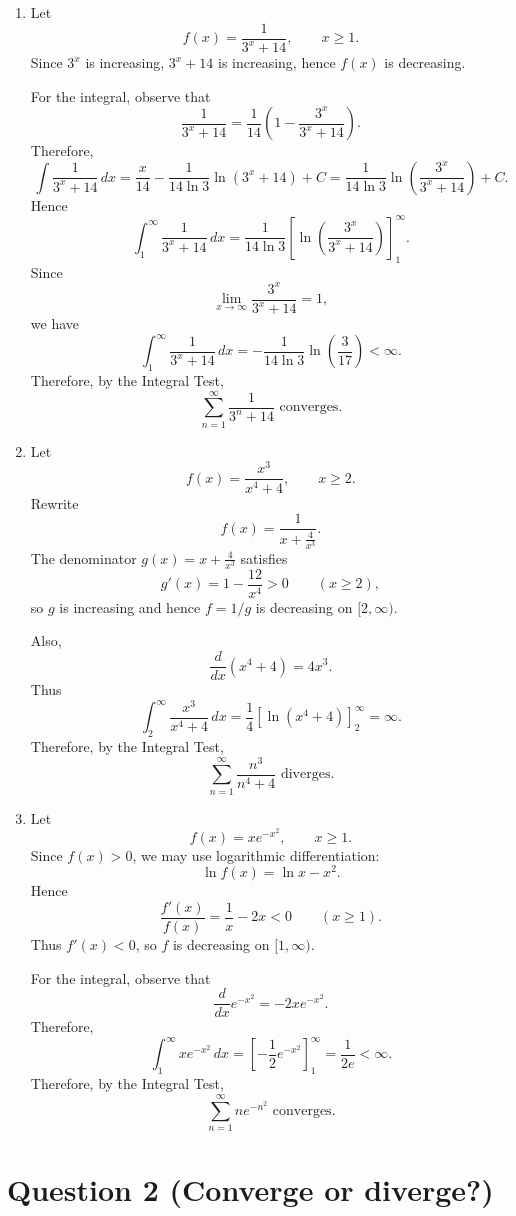 \documentclass[12pt]{article}
\begin{document}
\begin{enumerate}[label=(\alph*)]
\item Let
\[
f(x)=\frac{1}{3^x+14}, \qquad x\ge 1.
\]
Since \(3^x\) is increasing, \(3^x+14\) is increasing, hence \(f(x)\) is decreasing.

For the integral, observe that
\[
\frac{1}{3^x+14}
=
\frac{1}{14}
\left(1-\frac{3^x}{3^x+14}\right).
\]
Therefore,
\[
\int \frac{1}{3^x+14}\,dx
=
\frac{x}{14}
-
\frac{1}{14\ln 3}\ln(3^x+14)+C
=
\frac{1}{14\ln 3}
\ln\left(\frac{3^x}{3^x+14}\right)+C.
\]
Hence
\[
\int_1^\infty \frac{1}{3^x+14}\,dx
=
\frac{1}{14\ln 3}
\left[
\ln\left(\frac{3^x}{3^x+14}\right)
\right]_1^\infty.
\]
Since
\[
\lim_{x\to\infty}\frac{3^x}{3^x+14}=1,
\]
we have
\[
\int_1^\infty \frac{1}{3^x+14}\,dx
=
-\frac{1}{14\ln 3}\ln\left(\frac3{17}\right)
<\infty.
\]
Therefore, by the Integral Test,
\[
\boxed{\sum_{n=1}^{\infty}\frac{1}{3^n+14}\text{ converges}.}
\]

\item Let
\[
f(x)=\frac{x^3}{x^4+4}, \qquad x\ge 2.
\]
Rewrite
\[
f(x)=\frac1{x+\frac4{x^3}}.
\]
The denominator \(g(x)=x+\frac4{x^3}\) satisfies
\[
g'(x)=1-\frac{12}{x^4}>0
\qquad (x\ge 2),
\]
so \(g\) is increasing and hence \(f=1/g\) is decreasing on \([2,\infty)\).

Also,
\[
\frac{d}{dx}(x^4+4)=4x^3.
\]
Thus
\[
\int_2^\infty \frac{x^3}{x^4+4}\,dx
=
\frac14\left[\ln(x^4+4)\right]_2^\infty
=
\infty.
\]
Therefore, by the Integral Test,
\[
\boxed{\sum_{n=1}^{\infty}\frac{n^3}{n^4+4}\text{ diverges}.}
\]

\item Let
\[
f(x)=xe^{-x^2}, \qquad x\ge 1.
\]
Since \(f(x)>0\), we may use logarithmic differentiation:
\[
\ln f(x)=\ln x-x^2.
\]
Hence
\[
\frac{f'(x)}{f(x)}
=
\frac1x-2x<0
\qquad (x\ge 1).
\]
Thus \(f'(x)<0\), so \(f\) is decreasing on \([1,\infty)\).

For the integral, observe that
\[
\frac{d}{dx}e^{-x^2}
=
-2xe^{-x^2}.
\]
Therefore,
\[
\int_1^\infty xe^{-x^2}\,dx
=
\left[-\frac12e^{-x^2}\right]_1^\infty
=
\frac{1}{2e}
<\infty.
\]
Therefore, by the Integral Test,
\[
\boxed{\sum_{n=1}^{\infty}ne^{-n^2}\text{ converges}.}
\]
\end{enumerate}

\newpage
\section*{Question 2 (Converge or diverge?)}
\end{document}
